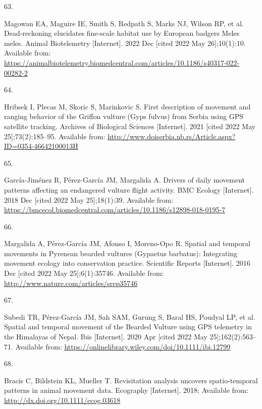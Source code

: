 \documentclass[10pt,a4paper]{article}
\newlength{\cslhangindent}
\newlength{\csllabelwidth}
\newlength{\cslentryspacingunit} %
\newenvironment{CSLReferences}[2] %
 {%
  \setlength{\parindent}{0pt}
  \ifodd #1
  \let\oldpar\par
  \def\par{\hangindent=\cslhangindent\oldpar}
  \fi
  \setlength{\parskip}{#2\cslentryspacingunit}
 }%
 {}
\newcommand{\CSLLeftMargin}[1]{\parbox[t]{\csllabelwidth}{#1}}
\newcommand{\CSLRightInline}[1]{\parbox[t]{\linewidth - \csllabelwidth}{#1}\break}
\begin{document}
\begin{CSLReferences}{0}{0}
\leavevmode{}%
\CSLLeftMargin{63. }
\CSLRightInline{Magowan EA, Maguire IE, Smith S, Redpath S, Marks NJ, Wilson RP, et al. Dead-reckoning elucidates fine-scale habitat use by {European} badgers {Meles} meles. Animal Biotelemetry {[}Internet{]}. 2022 Dec {[}cited 2022 May 26{]};10(1):10. Available from: \url{https://animalbiotelemetry.biomedcentral.com/articles/10.1186/s40317-022-00282-2}}

\leavevmode{}%
\CSLLeftMargin{64. }
\CSLRightInline{Hribsek I, Plecas M, Skoric S, Marinkovic S. First description of movement and ranging behavior of the {Griffon} vulture ({Gyps} fulvus) from {Serbia} using {GPS} satellite tracking. Archives of Biological Sciences {[}Internet{]}. 2021 {[}cited 2022 May 25{]};73(2):185--95. Available from: \url{http://www.doiserbia.nb.rs/Article.aspx?ID=0354-46642100013H}}

\leavevmode{}%
\CSLLeftMargin{65. }
\CSLRightInline{García-Jiménez R, Pérez-García JM, Margalida A. Drivers of daily movement patterns affecting an endangered vulture flight activity. BMC Ecology {[}Internet{]}. 2018 Dec {[}cited 2022 May 25{]};18(1):39. Available from: \url{https://bmcecol.biomedcentral.com/articles/10.1186/s12898-018-0195-7}}

\leavevmode{}%
\CSLLeftMargin{66. }
\CSLRightInline{Margalida A, Pérez-García JM, Afonso I, Moreno-Opo R. Spatial and temporal movements in {Pyrenean} bearded vultures ({Gypaetus} barbatus): {Integrating} movement ecology into conservation practice. Scientific Reports {[}Internet{]}. 2016 Dec {[}cited 2022 May 25{]};6(1):35746. Available from: \url{http://www.nature.com/articles/srep35746}}

\leavevmode{}%
\CSLLeftMargin{67. }
\CSLRightInline{Subedi TR, Pérez‐García JM, Sah SAM, Gurung S, Baral HS, Poudyal LP, et al. Spatial and temporal movement of the {Bearded} {Vulture} using {GPS} telemetry in the {Himalayas} of {Nepal}. Ibis {[}Internet{]}. 2020 Apr {[}cited 2022 May 25{]};162(2):563--71. Available from: \url{https://onlinelibrary.wiley.com/doi/10.1111/ibi.12799}}

\leavevmode{}%
\CSLLeftMargin{68. }
\CSLRightInline{Bracis C, Bildstein KL, Mueller T. Revisitation analysis uncovers spatio-temporal patterns in animal movement data. Ecography {[}Internet{]}. 2018; Available from: \url{http://dx.doi.org/10.1111/ecog.03618}}


\end{CSLReferences}
\end{document}
